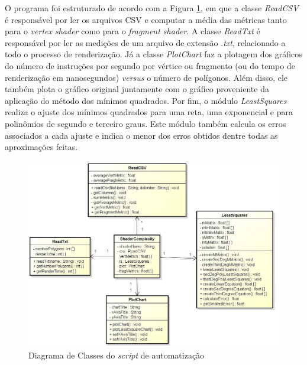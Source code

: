 	O programa foi estruturado de acordo com a Figura \ref{minquad_diag}, em que a classe \textit{ReadCSV} é responsável por ler os arquivos CSV e computar a média das métricas tanto para o \textit{vertex shader} como para o \textit{fragment shader}. A classe \textit{ReadTxt} é responsável por ler as medições de um arquivo de extensão .\textit{txt}, relacionado a todo o processo de renderização. Já a classe \textit{PlotChart} faz a plotagem dos gráficos do número de instruções por segundo por vértice ou fragmento (ou do tempo de renderização em nanosegundos) \textit{versus} o número de polígonos. Além disso, ele também plota o gráfico original juntamente com o gráfico proveniente da aplicação do método dos mínimos quadrados. Por fim, o módulo \textit{LeastSquares} realiza o ajuste dos mínimos quadrados para uma reta, uma exponencial e para polinômios de segundo e terceiro graus. Este módulo também calcula os erros associados a cada ajuste e indica o menor dos erros obtidos dentre todas as aproximações feitas. 

	\begin{figure}[ht]
	\centering
		\includegraphics[keepaspectratio=true,scale=0.58]{figuras/minquad_diag.jpg}
	\caption{Diagrama de Classes do \textit{script} de automatização}
	\label{minquad_diag}
	\end{figure}

